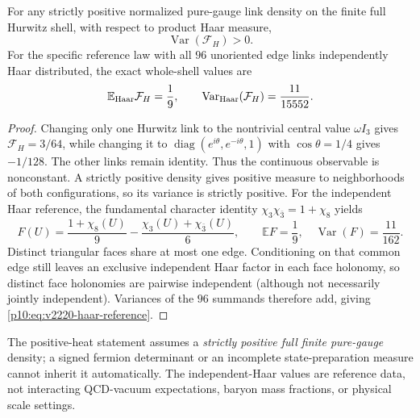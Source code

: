 \documentclass[12pt,a4paper]{article}
\begin{document}
\begin{theorem}
\label{p10:thm:v2220-haar-flux}
For any strictly positive normalized pure-gauge link density on the
finite full Hurwitz shell, with respect to product Haar measure,
\begin{equation}
\label{p10:eq:v2220-positive-variance}
  \operatorname{Var}(\mathcal F_H)>0.
\end{equation}
For the specific reference law with all $96$ unoriented edge links
independently Haar distributed, the exact whole-shell values are
\begin{equation}
\label{p10:eq:v2220-haar-reference}
 \mathbb E_{\rm Haar}\mathcal F_H=\frac19,\qquad
 \operatorname{Var}_{\rm Haar}(\mathcal F_H)=\frac{11}{15552}.
\end{equation}
\end{theorem}
\begin{proof}
Changing only one Hurwitz link to the nontrivial central value
$\omega I_3$ gives $\mathcal F_H=3/64$, while changing it to
$\operatorname{diag}(e^{i\theta},e^{-i\theta},1)$ with
$\cos\theta=1/4$ gives $-1/128$.  The other links remain identity.
Thus the continuous observable is nonconstant.  A strictly positive
density gives positive measure to neighborhoods of both configurations,
so its variance is strictly positive.
For the independent Haar reference, the fundamental character identity
$\chi_3\chi_{\bar3}=1+\chi_8$ yields
\[
 F(U)=\frac{1+\chi_8(U)}9
     -\frac{\chi_3(U)+\chi_{\bar3}(U)}6,
\qquad
 \mathbb E F=\frac19,\quad\operatorname{Var}(F)=\frac{11}{162}.
\]
Distinct triangular faces share at most one edge.  Conditioning on
that common edge still leaves an exclusive independent Haar factor in
each face holonomy, so distinct face holonomies are pairwise
independent (although not necessarily jointly independent).  Variances
of the $96$ summands therefore add, giving \eqref{p10:eq:v2220-haar-reference}.
\end{proof}
The positive-heat statement assumes a \emph{strictly positive full
finite pure-gauge} density; a signed fermion determinant or an incomplete
state-preparation measure cannot inherit it automatically.  The
independent-Haar values are reference data, not interacting QCD-vacuum
expectations, baryon mass fractions, or physical scale settings.



\end{document}
